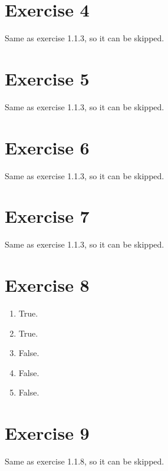 \documentclass[12pt]{article}
\begin{document}
    \section*{Exercise 4}
    Same as exercise 1.1.3, so it can be skipped.


    \section*{Exercise 5}
    Same as exercise 1.1.3, so it can be skipped.


    \section*{Exercise 6}
    Same as exercise 1.1.3, so it can be skipped.


    \section*{Exercise 7}
    Same as exercise 1.1.3, so it can be skipped.


    \section*{Exercise 8}
    \begin{enumerate}[label=\textbf{\alph*.}]
        \item
            True.
        \item
            True.
        \item 
            False.
        \item 
            False.
        \item
            False.
    \end{enumerate}


    \section*{Exercise 9}
    Same as exercise 1.1.8, so it can be skipped.
\end{document}
